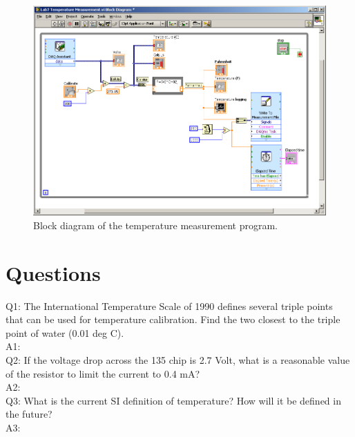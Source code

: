 \documentclass[11pt,letterpaper]{article}
\begin{document}
\begin{figure}
\centering
\includegraphics[width=1\linewidth]{Lab8_TemperatureMeasurementUsingLabVIEW_BlockDiagram}
\caption{Block diagram of the temperature measurement program.}
\label{fig:Lab8_TemperatureMeasurementUsingLabVIEW_BlockDiagram}
\end{figure}
 
\section{Questions}

Q1: The International Temperature Scale of 1990 defines several triple points that can be used for temperature calibration. Find the two closest to the triple point of water (0.01 deg C).\\
A1:\\

Q2:	If the voltage drop across the 135 chip is 2.7 Volt, what is a reasonable value of the resistor to limit the current to 0.4 mA?\\
A2:\\


Q3:	What is the current SI definition of temperature? How will it be defined in the future?\\ 
A3:\\
\end{document}
